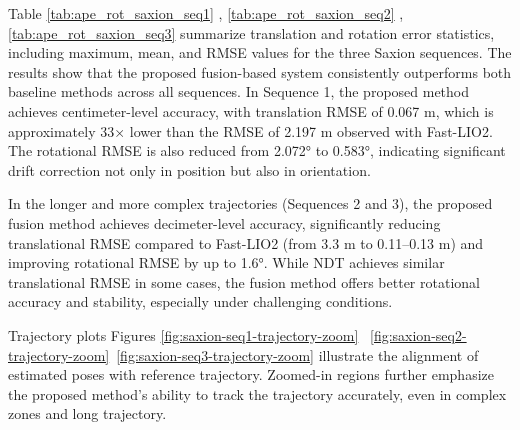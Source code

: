  Table \ref{tab:ape_rot_saxion_seq1} , \ref{tab:ape_rot_saxion_seq2} , \ref{tab:ape_rot_saxion_seq3} summarize translation and rotation error statistics, including maximum, mean, and RMSE values for the three Saxion sequences. The results show that the proposed fusion-based system consistently outperforms both baseline methods across all sequences. In Sequence 1, the proposed method achieves centimeter-level accuracy, with  translation RMSE of 0.067 m, which is approximately 33× lower than the RMSE of 2.197 m observed with Fast-LIO2. The rotational RMSE is also reduced from 2.072° to 0.583°, indicating significant drift correction not only in position but also in orientation.

 In the longer and more complex trajectories (Sequences 2 and 3), the proposed fusion method achieves decimeter-level accuracy, significantly reducing translational RMSE compared to Fast-LIO2 (from 3.3 m to 0.11–0.13 m) and improving rotational RMSE by up to 1.6°. While NDT achieves similar translational RMSE in some cases, the fusion method offers better rotational accuracy and stability, especially under challenging conditions.
 
Trajectory plots Figures \ref{fig:saxion-seq1-trajectory-zoom}~ \ref{fig:saxion-seq2-trajectory-zoom}~\ref{fig:saxion-seq3-trajectory-zoom}  illustrate the alignment of estimated poses with reference trajectory. Zoomed-in regions further emphasize the proposed method’s ability to track the trajectory accurately, even in complex zones and long trajectory.




